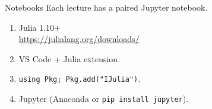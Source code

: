\documentclass[10pt,aspectratio=169]{beamer}
\begin{document}
\begin{frame}{Notebooks}
  Each lecture has a paired Jupyter notebook.
  \begin{enumerate}
    \item Julia 1.10+\\
      \footnotesize\url{https://julialang.org/downloads/}
    \item \normalsize VS Code + Julia extension.
    \item \texttt{using Pkg; Pkg.add("IJulia")}.
    \item Jupyter (Anaconda or \texttt{pip install jupyter}).
  \end{enumerate}
\end{frame}
\end{document}
